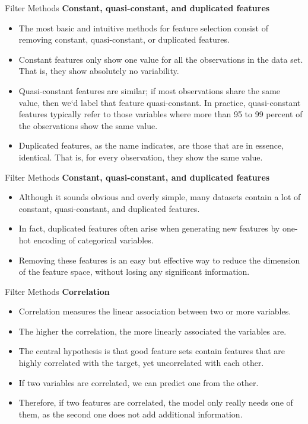 \documentclass[11pt]{beamer}
\begin{document}
\begin{frame}{Filter Methods}
\textbf{Constant, quasi-constant, and duplicated features}
	\begin{itemize}
		\item The most basic and intuitive methods for feature selection consist of removing constant, quasi-constant, or duplicated features.
		\item Constant features only show one value for all the observations in the data set. That is, they show absolutely no variability.
		\item Quasi-constant features are similar; if most observations share the same value, then we`d label that feature quasi-constant. In practice, quasi-constant features typically refer to those variables where more than 95 to 99 percent of the observations show the same value.
		\item Duplicated features, as the name indicates, are those that are in essence, identical. That is, for every observation, they show the same value.
	\end{itemize}
\end{frame}
\begin{frame}{Filter Methods}
\textbf{Constant, quasi-constant, and duplicated features}
	\begin{itemize}
		\item Although it sounds obvious and overly simple, many datasets contain a lot of constant, quasi-constant, and duplicated features. 
		\item In fact, duplicated features often arise when generating new features by one-hot encoding of categorical variables. 
		\item Removing these features is an easy but effective way to reduce the dimension of the feature space, without losing any significant information.
	\end{itemize}
\end{frame}
\begin{frame}{Filter Methods}
\textbf{Correlation}
	\begin{itemize}
		\item Correlation measures the linear association between two or more variables. 
		\item The higher the correlation, the more linearly associated the variables are. 
		\item The central hypothesis is that good feature sets contain features that are highly correlated with the target, yet uncorrelated with each other.
		\item If two variables are correlated, we can predict one from the other. 
		\item Therefore, if two features are correlated, the model only really needs one of them, as the second one does not add additional information.
	\end{itemize}
\end{frame}
\end{document}
